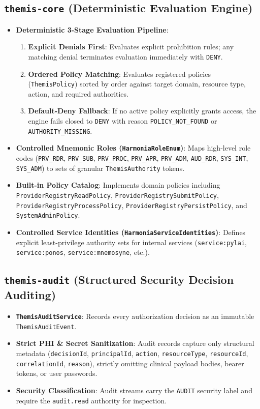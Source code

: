 \subsection{\texttt{themis-core} (Deterministic Evaluation Engine)}
\begin{itemize}
    \item \textbf{Deterministic 3-Stage Evaluation Pipeline}:
    \begin{enumerate}
        \item \textbf{Explicit Denials First}: Evaluates explicit prohibition rules; any matching denial terminates evaluation immediately with \texttt{DENY}.
        \item \textbf{Ordered Policy Matching}: Evaluates registered policies (\texttt{ThemisPolicy}) sorted by order against target domain, resource type, action, and required authorities.
        \item \textbf{Default-Deny Fallback}: If no active policy explicitly grants access, the engine fails closed to \texttt{DENY} with reason \texttt{POLICY\_NOT\_FOUND} or \texttt{AUTHORITY\_MISSING}.
    \end{enumerate}
    \item \textbf{Controlled Mnemonic Roles (\texttt{HarmoniaRoleEnum})}: Maps high-level role codes (\texttt{PRV\_RDR}, \texttt{PRV\_SUB}, \texttt{PRV\_PROC}, \texttt{PRV\_APR}, \texttt{PRV\_ADM}, \texttt{AUD\_RDR}, \texttt{SYS\_INT}, \texttt{SYS\_ADM}) to sets of granular \texttt{ThemisAuthority} tokens.
    \item \textbf{Built-in Policy Catalog}: Implements domain policies including \texttt{ProviderRegistryReadPolicy}, \texttt{ProviderRegistrySubmitPolicy}, \texttt{ProviderRegistryProcessPolicy}, \texttt{ProviderRegistryPersistPolicy}, and \texttt{SystemAdminPolicy}.
    \item \textbf{Controlled Service Identities (\texttt{HarmoniaServiceIdentities})}: Defines explicit least-privilege authority sets for internal services (\texttt{service:pylai}, \texttt{service:ponos}, \texttt{service:mnemosyne}, etc.).
\end{itemize}

\subsection{\texttt{themis-audit} (Structured Security Decision Auditing)}
\begin{itemize}
    \item \textbf{\texttt{ThemisAuditService}}: Records every authorization decision as an immutable \texttt{ThemisAuditEvent}.
    \item \textbf{Strict PHI \& Secret Sanitization}: Audit records capture only structural metadata (\texttt{decisionId}, \texttt{principalId}, \texttt{action}, \texttt{resourceType}, \texttt{resourceId}, \texttt{correlationId}, \texttt{reason}), strictly omitting clinical payload bodies, bearer tokens, or user passwords.
    \item \textbf{Security Classification}: Audit streams carry the \texttt{AUDIT} security label and require the \texttt{audit.read} authority for inspection.
\end{itemize}

